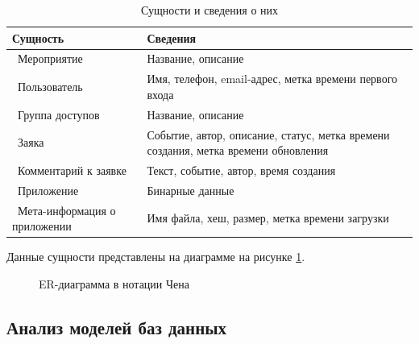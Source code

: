 \begin{table}[ht!]
	\centering
	\caption{Сущности и сведения о них}
	\label{decisions}
	\begin{tabular}{|p{4.3cm}|p{10.3cm}|}
		\hline
		\textbf{Сущность} & \textbf{Сведения}\\
		\hline 
		\ Мероприятие & Название, описание \\
		\hline 
		\ Пользователь &  Имя, телефон, email-адрес, метка времени первого входа \\
		\hline 
		\ Группа доступов & Название, описание \\
		\hline 
		\ Заяка & Событие, автор, описание, статус, метка времени создания, метка времени обновления\\
		\hline 
		\ Комментарий к заявке & Текст, событие, автор, время создания \\
		\hline 
		\ Приложение & Бинарные данные \\
		\hline 
		\ Мета-информация о приложении & Имя файла, хеш, размер, метка времени загрузки \\
		\hline
	\end{tabular}
\end{table}

Данные сущности представлены на диаграмме на рисунке \ref{fig:chen}.

\begin{figure}[h!]
	\caption{ER-диаграмма в нотации Чена}
	\label{fig:chen}
\end{figure}

\subsection{Анализ моделей баз данных}

